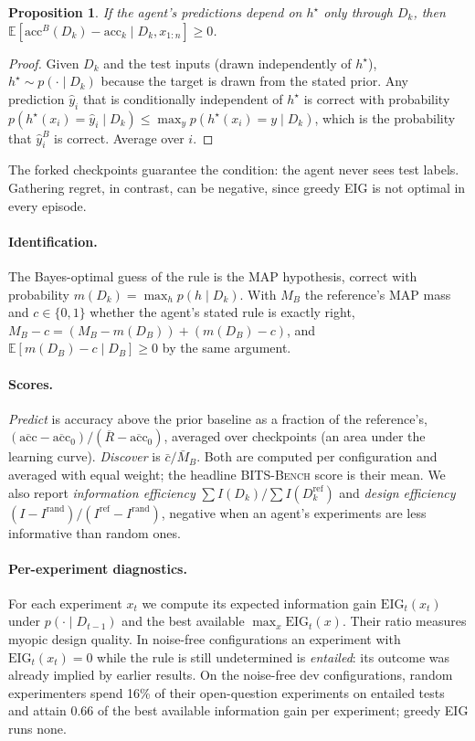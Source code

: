 \documentclass[11pt]{article}
\newtheorem{proposition}{Proposition}
\newcommand{\E}{\mathbb{E}}
\newcommand{\bench}{\textsc{BITS-Bench}}
\begin{document}
\begin{proposition}\label{prop:infer}
If the agent's predictions depend on $h^\star$ only through $D_k$, then
$\E[\mathrm{acc}^B(D_k) - \mathrm{acc}_k \mid D_k, x_{1:n}] \ge 0$.
\end{proposition}
\begin{proof}
Given $D_k$ and the test inputs (drawn independently of $h^\star$), $h^\star \sim p(\cdot\mid D_k)$
because the target is drawn from the stated prior. Any prediction $\hat y_i$ that is conditionally
independent of $h^\star$ is correct with probability $p(h^\star(x_i)=\hat y_i\mid D_k) \le
\max_y p(h^\star(x_i)=y\mid D_k)$, which is the probability that $\hat y^B_i$ is correct. Average over
$i$.
\end{proof}
The forked checkpoints guarantee the condition: the agent never sees test labels. Gathering regret, in
contrast, can be negative, since greedy EIG is not optimal in every episode.

\paragraph{Identification.} The Bayes-optimal guess of the rule is the MAP hypothesis, correct with
probability $m(D_k) = \max_h p(h\mid D_k)$. With $M_B$ the reference's MAP mass and $c\in\{0,1\}$
whether the agent's stated rule is exactly right,
$M_B - c = (M_B - m(D_B)) + (m(D_B) - c)$, and $\E[m(D_B) - c\mid D_B]\ge 0$ by the same argument.

\paragraph{Scores.} \emph{Predict} is accuracy above the prior baseline as a fraction of the
reference's, $(\overline{\mathrm{acc}} - \overline{\mathrm{acc}}_0)/(\overline{R} -
\overline{\mathrm{acc}}_0)$, averaged over checkpoints (an area under the learning curve).
\emph{Discover} is $\bar c / \bar M_B$. Both are computed per configuration and averaged with equal
weight; the headline \bench{} score is their mean. We also report \emph{information efficiency}
$\sum I(D_k)/\sum I(D^{\mathrm{ref}}_k)$ and \emph{design efficiency}
$(I - I^{\mathrm{rand}})/(I^{\mathrm{ref}} - I^{\mathrm{rand}})$, negative when an agent's experiments are
less informative than random ones.

\paragraph{Per-experiment diagnostics.} For each experiment $x_t$ we compute its expected information
gain $\mathrm{EIG}_t(x_t)$ under $p(\cdot\mid D_{t-1})$ and the best available
$\max_x \mathrm{EIG}_t(x)$. Their ratio measures myopic design quality. In noise-free configurations an
experiment with $\mathrm{EIG}_t(x_t)=0$ while the rule is still undetermined is \emph{entailed}: its
outcome was already implied by earlier results. On the noise-free dev configurations, random
experimenters spend 16\% of their open-question experiments on entailed tests and attain 0.66 of the
best available information gain per experiment; greedy EIG runs none.
\end{document}
